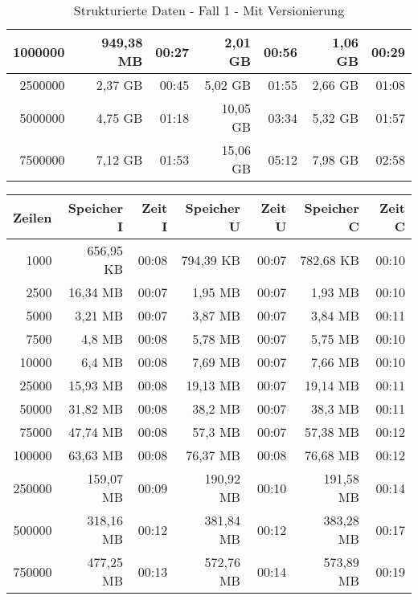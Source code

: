 \begin{table}[h!]
\begin{tabular}{|r|r|r|r|r|r|r|}
        1000000 & 949,38 MB & 00:27 & 2,01 GB  	& 00:56 & 1,06 GB   & 00:29 \\ \hline
        2500000 & 2,37 GB   & 00:45 & 5,02 GB  	& 01:55 & 2,66 GB   & 01:08 \\ \hline
        5000000 & 4,75 GB   & 01:18 & 10,05 GB	& 03:34 & 5,32 GB   & 01:57 \\ \hline
        7500000 & 7,12 GB   & 01:53 & 15,06 GB 	& 05:12 & 7,98 GB   & 02:58 \\ \hline
    \end{tabular}
    \caption{Strukturierte Daten - Fall 1 - Mit Versionierung}
    \label{tab:sql-80-20-40-cdc}
\end{table}

\begin{table}[h!]
    \centering
    \begin{tabular}{|r|r|r|r|r|r|r|}
        \hline
        \textbf{Zeilen} & \textbf{Speicher I} & \textbf{Zeit I} & \textbf{Speicher U} & \textbf{Zeit U} & \textbf{Speicher C} & \textbf{Zeit C} \\ \hline
        1000    & 656,95 KB & 00:08 & 794,39 KB & 00:07 & 782,68 KB & 00:10 \\ \hline
        2500    & 16,34 MB  & 00:07 & 1,95 MB   & 00:07 & 1,93 MB   & 00:10 \\ \hline
        5000    & 3,21 MB   & 00:07 & 3,87 MB   & 00:07 & 3,84 MB   & 00:11 \\ \hline
        7500    & 4,8 MB    & 00:08 & 5,78 MB   & 00:07 & 5,75 MB   & 00:10 \\ \hline
        10000   & 6,4 MB    & 00:08 & 7,69 MB   & 00:07 & 7,66 MB   & 00:10 \\ \hline
        25000   & 15,93 MB  & 00:08 & 19,13 MB  & 00:07 & 19,14 MB  & 00:11 \\ \hline
        50000   & 31,82 MB  & 00:08 & 38,2 MB   & 00:07 & 38,3 MB   & 00:11 \\ \hline
        75000   & 47,74 MB  & 00:08 & 57,3 MB   & 00:07 & 57,38 MB  & 00:12 \\ \hline
        100000  & 63,63 MB  & 00:08 & 76,37 MB  & 00:08 & 76,68 MB  & 00:12 \\ \hline
        250000  & 159,07 MB & 00:09 & 190,92 MB & 00:10 & 191,58 MB & 00:14 \\ \hline
        500000  & 318,16 MB & 00:12 & 381,84 MB & 00:12 & 383,28 MB & 00:17 \\ \hline
        750000  & 477,25 MB & 00:13 & 572,76 MB & 00:14 & 573,89 MB & 00:19 \\ \hline

\end{tabular}
\end{table}

